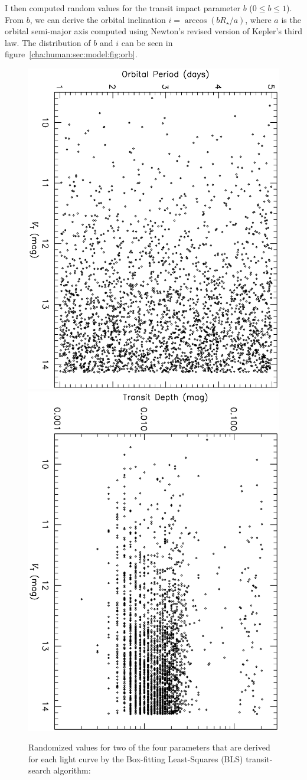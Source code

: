 I then computed random values for the transit impact parameter $b$ ($0\leq b\leq 1$). 
From $b$, we can derive the orbital inclination $i= \arccos{(b R_{\star}/a)}$, where $a$ is the orbital semi-major axis computed using Newton's revised version of Kepler's third law.
The distribution of $b$ and $i$ can be seen in figure~\ref{cha:human:sec:model:fig:orb}. 

\begin{figure}
\begin{center}
\centering
\includegraphics[width=.55\textwidth, angle=90]{7_bls_a}\\
\includegraphics[width=.55\textwidth, angle=90]{7_bls_b}\\
\caption[Randomized values for first two BLS parameters]{%
Randomized values for two of the four parameters that are derived for each light curve by the Box-fitting Least-Squares (BLS) transit-search algorithm: %
}
\end{center}
\end{figure}
